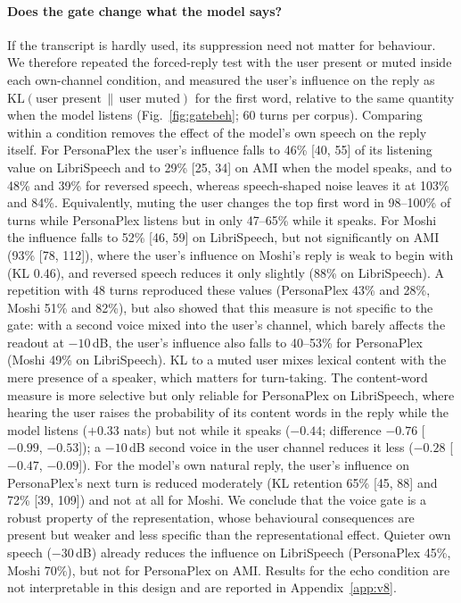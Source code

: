 \documentclass[11pt,a4paper]{article}
\newcommand{\PP}{PersonaPlex}
\begin{document}
\paragraph{Does the gate change what the model says?}
If the transcript is hardly used, its suppression need not matter for behaviour.
We therefore repeated the forced-reply test with the user present or muted inside each own-channel condition, and measured the user's influence on the reply as $\mathrm{KL}(\text{user present}\,\|\,\text{user muted})$ for the first word, relative to the same quantity when the model listens (Fig.~\ref{fig:gatebeh}; 60 turns per corpus).
Comparing within a condition removes the effect of the model's own speech on the reply itself.
For \PP{} the user's influence falls to 46\% [40, 55] of its listening value on LibriSpeech and to 29\% [25, 34] on AMI when the model speaks, and to 48\% and 39\% for reversed speech, whereas speech-shaped noise leaves it at 103\% and 84\%.
Equivalently, muting the user changes the top first word in 98--100\% of turns while \PP{} listens but in only 47--65\% while it speaks.
For Moshi the influence falls to 52\% [46, 59] on LibriSpeech, but not significantly on AMI (93\% [78, 112]), where the user's influence on Moshi's reply is weak to begin with (KL 0.46), and reversed speech reduces it only slightly (88\% on LibriSpeech).
A repetition with 48 turns reproduced these values (\PP{} 43\% and 28\%, Moshi 51\% and 82\%), but also showed that this measure is not specific to the gate: with a second voice mixed into the user's channel, which barely affects the readout at $-10$\,dB, the user's influence also falls to 40--53\% for \PP{} (Moshi 49\% on LibriSpeech).
KL to a muted user mixes lexical content with the mere presence of a speaker, which matters for turn-taking.
The content-word measure is more selective but only reliable for \PP{} on LibriSpeech, where hearing the user raises the probability of its content words in the reply while the model listens ($+0.33$ nats) but not while it speaks ($-0.44$; difference $-0.76$ [$-0.99$, $-0.53$]); a $-10$\,dB second voice in the user channel reduces it less ($-0.28$ [$-0.47$, $-0.09$]).
For the model's own natural reply, the user's influence on \PP{}'s next turn is reduced moderately (KL retention 65\% [45, 88] and 72\% [39, 109]) and not at all for Moshi.
We conclude that the voice gate is a robust property of the representation, whose behavioural consequences are present but weaker and less specific than the representational effect.
Quieter own speech ($-30$\,dB) already reduces the influence on LibriSpeech (\PP{} 45\%, Moshi 70\%), but not for \PP{} on AMI.
Results for the echo condition are not interpretable in this design and are reported in Appendix~\ref{app:v8}.
\end{document}
